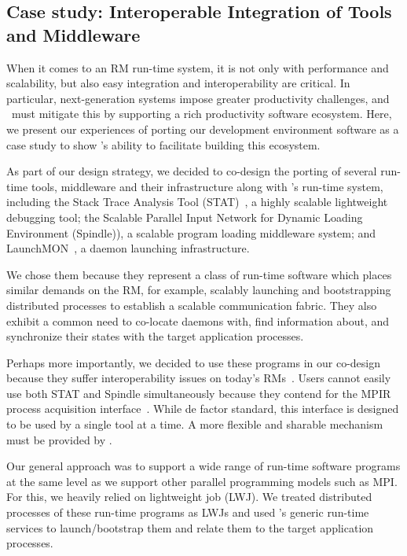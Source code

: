 \subsection{Case study: Interoperable Integration of Tools and Middleware}
\label{case}
When it comes to an RM run-time system, it is 
not only with performance and scalability,
but also easy integration and interoperability are critical.
In particular, next-generation systems impose greater productivity
challenges, and \flux\ must mitigate this by supporting a rich 
productivity software ecosystem. 
Here, we present our experiences of porting our development
environment software as a case study
to show \flux's ability to facilitate building this ecosystem. 

As part of our design strategy, we decided to 
co-design the porting of several run-time tools, middleware 
and their infrastructure along with \flux's run-time system,
including the Stack Trace Analysis Tool (STAT)~\cite{STAT},
a highly scalable lightweight debugging tool;
the Scalable Parallel Input Network for Dynamic Loading
Environment ({\sc Spindle})),
a scalable program loading middleware system;
and LaunchMON~\cite{launchmon}, a daemon launching infrastructure.

We chose them because they represent a class of run-time
software which places similar demands on the RM,
for example, scalably launching and bootstrapping
distributed processes to establish a scalable 
communication fabric.
They also exhibit a common need to co-locate daemons with, 
find information about, and synchronize their states with 
the target application processes.

Perhaps more importantly, we decided to use these programs
in our co-design because they suffer interoperability issues on 
today's RMs~\cite{Jette02slurm,ALPS,BGQRes,Castain05theopen}.
Users cannot easily use both STAT
and {\sc Spindle} simultaneously because they contend for
the MPIR process acquisition interface~\cite{MPIRInterface}.
While de factor standard, this interface is designed 
to be used by a single tool at a time. 
A more flexible and sharable mechanism must be provided by \flux.

Our general approach was to support a wide range of run-time software programs 
at the same level as we support other parallel programming 
models such as MPI. For this, we heavily relied on lightweight 
job (LWJ). We treated 
distributed processes of these run-time programs
as LWJs and used \flux's 
generic run-time services to launch/bootstrap them and 
relate them to the target application processes.

